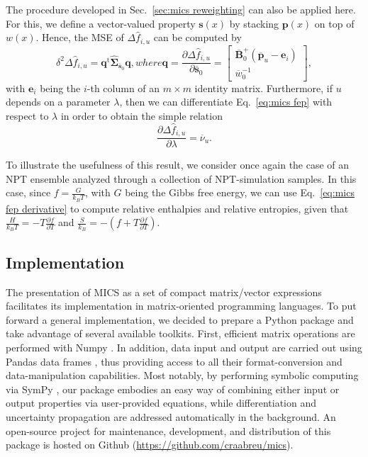 \documentclass[
    journal=jctcce,
    layout=twocolumn
]{achemso}
\newcommand{\mt}[1]{\boldsymbol{\mathbf{#1}}}   %
\newcommand{\vt}[1]{\boldsymbol{\mathbf{#1}}}   %
\newcommand{\tr}[1]{#1^\text{t}}                %
\newcommand{\diff}[2]{\frac{\partial #2}{\partial #1}} %
\newcommand{\avg}[1]{\overline{#1}}             %
\begin{document}
The procedure developed in Sec.~\ref{sec:mics reweighting} can also be applied here. For this, we define a vector-valued property $\vt s(x)$ by stacking $\vt p(x)$ on top of $w(x)$. Hence, the MSE of $\Delta {\hat f}_{i,u}$ can be computed by
\begin{subequations}
	\label{eq:mics fep uncertainty}
	\begin{equation}
	\label{eq:mics fep delta method}
	\delta^2 \Delta {\hat f}_{i,u} = \tr{\vt q} \hat{\mt \Sigma}_{\avg{\vt s}_0} {\vt q},
	\end{equation}
	where
	\begin{equation}
	\label{eq:mics fep gradient}
	{\vt q} = \diff{\avg{\vt s}_0}{\Delta {\hat f}_{i,u}} =
	\left[\begin{array}{c}
	\avg{\mt B}_0^+  (\avg{\vt p}_u - {\vt e}_i) \\
	\avg{w}_0^{-1}
	\end{array}\right],
	\end{equation}
\end{subequations}
with $\vt e_i$ being the $i$-th column of an $m \times m$ identity matrix. Furthermore, if $u$ depends on a parameter $\lambda$, then we can differentiate Eq.~\eqref{eq:mics fep} with respect to $\lambda$ in order to obtain the simple relation
\begin{equation}
\label{eq:mics fep derivative}
\frac{\partial \Delta {\hat f}_{i,u}}{\partial \lambda} = \avg{\nu}_u.
\end{equation}

To illustrate the usefulness of this result, we consider once again the case of an NPT ensemble analyzed through a collection of NPT-simulation samples. In this case, since $f = \frac{G}{k_B T}$, with $G$ being the Gibbs free energy, we can use Eq.~\eqref{eq:mics fep derivative} to compute relative enthalpies and relative entropies, given that $\frac{H}{k_B T} = - T \frac{\partial f}{\partial T}$ and $\frac{S}{k_B} = -(f + T \frac{\partial f}{\partial T})$.

\subsection{Implementation}

The presentation of MICS as a set of compact matrix/vector expressions facilitates its implementation in matrix-oriented programming languages. To put forward a general implementation, we decided to prepare a Python package and take advantage of several available toolkits. First, efficient matrix operations are performed with Numpy \cite{Van_der_walt_2011}. In addition, data input and output are carried out using Pandas data frames \cite{Mckinney_2010}, thus providing access to all their format-conversion and data-manipulation capabilities. Most notably, by performing symbolic computing via SymPy \cite{Meurer_2017}, our package embodies an easy way of combining either input or output properties via user-provided equations, while differentiation and uncertainty propagation are addressed automatically in the background. An open-source project for maintenance, development, and distribution of this package is hosted on Github  (\url{https://github.com/craabreu/mics}).
\end{document}
